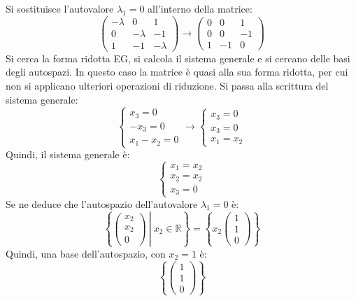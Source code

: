 \documentclass[a4paper]{article}
\begin{document}
	\noindent
	Si sostituisce l'autovalore $\lambda_{1} = 0$ all'interno della matrice:
	\begin{equation*}
		\begin{pmatrix}
			-\lambda & 0 & 1 \\
			0 & -\lambda & -1 \\
			1 & -1 & -\lambda
		\end{pmatrix}
		\longrightarrow
		\begin{pmatrix}
			0 & 0 & 1 \\
			0 & 0 & -1 \\
			1 & -1 & 0
		\end{pmatrix}
	\end{equation*}
	Si cerca la forma ridotta EG, si calcola il sistema generale e si cercano delle basi degli autospazi. In questo caso la matrice è quasi alla sua forma ridotta, per cui non si applicano ulteriori operazioni di riduzione. Si passa alla scrittura del sistema generale:
	\begin{equation*}
		\begin{cases}
			x_{3} = 0 \\
			-x_{3} = 0 \\
			x_{1} - x_{2} = 0
		\end{cases}
		\longrightarrow
		\begin{cases}
			x_{3} = 0 \\
			x_{3} = 0 \\
			x_{1} = x_{2}
		\end{cases}
	\end{equation*}
	Quindi, il sistema generale è:
	\begin{equation*}
		\begin{cases}
			x_{1} = x_{2} \\
			x_{2} = x_{2} \\
			x_{3} = 0
		\end{cases}
	\end{equation*}
	Se ne deduce che l'autospazio dell'autovalore $\lambda_{1} = 0$ è:
	\begin{equation*}
		\left\{\left.\begin{pmatrix}
			x_{2} \\ x_{2} \\ 0
		\end{pmatrix} \: \right| \: x_{2} \in \mathbb{R}\right\} = \left\{x_{2} \begin{pmatrix}
			1 \\ 1 \\ 0
		\end{pmatrix}\right\}
	\end{equation*}
	Quindi, una base dell'autospazio, con $x_{2} = 1$ è:
	\begin{equation*}
		\left\{\begin{pmatrix}
			1 \\ 1 \\ 0
		\end{pmatrix}\right\}
	\end{equation*}\newpage
	
\end{document}
